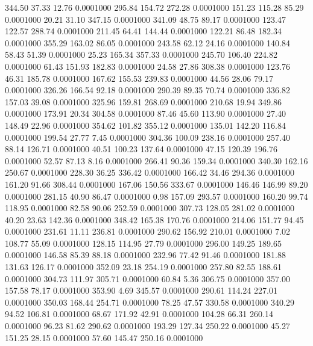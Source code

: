  344.50   37.33   12.76   0.0001000
 295.84  154.72  272.28   0.0001000
 151.23  115.28   85.29   0.0001000
  20.21   31.10  347.15   0.0001000
 341.09   48.75   89.17   0.0001000
 123.47  122.57  288.74   0.0001000
 211.45   64.41  144.44   0.0001000
 122.21   86.48  182.34   0.0001000
 355.29  163.02   86.05   0.0001000
 243.58   62.12   24.16   0.0001000
 140.84   58.43   51.39   0.0001000
  25.23  165.34  357.33   0.0001000
 245.70  106.40  224.82   0.0001000
  61.43  151.93  182.83   0.0001000
  24.58   27.86  308.38   0.0001000
 123.76   46.31  185.78   0.0001000
 167.62  155.53  239.83   0.0001000
  44.56   28.06   79.17   0.0001000
 326.26  166.54   92.18   0.0001000
 290.39   89.35   70.74   0.0001000
 336.82  157.03   39.08   0.0001000
 325.96  159.81  268.69   0.0001000
 210.68   19.94  349.86   0.0001000
 173.91   20.34  304.58   0.0001000
  87.46   45.60  113.90   0.0001000
  27.40  148.49   22.96   0.0001000
 354.62  101.82  355.12   0.0001000
 135.01  142.20  116.84   0.0001000
 199.54   27.77    7.45   0.0001000
 304.36  100.09  238.16   0.0001000
 257.40   88.14  126.71   0.0001000
  40.51  100.23  137.64   0.0001000
  47.15  120.39  196.76   0.0001000
  52.57   87.13    8.16   0.0001000
 266.41   90.36  159.34   0.0001000
 340.30  162.16  250.67   0.0001000
 228.30   36.25  336.42   0.0001000
 166.42   34.46  294.36   0.0001000
 161.20   91.66  308.44   0.0001000
 167.06  150.56  333.67   0.0001000
 146.46  146.99   89.20   0.0001000
 281.15   40.90   86.47   0.0001000
   0.98  157.09  293.57   0.0001000
 160.20   99.74  118.95   0.0001000
  82.58   90.06  252.59   0.0001000
 307.73  128.05  281.02   0.0001000
  40.20   23.63  142.36   0.0001000
 348.42  165.38  170.76   0.0001000
 214.06  151.77   94.45   0.0001000
 231.61   11.11  236.81   0.0001000
 290.62  156.92  210.01   0.0001000
   7.02  108.77   55.09   0.0001000
 128.15  114.95   27.79   0.0001000
 296.00  149.25  189.65   0.0001000
 146.58   85.39   88.18   0.0001000
 232.96   77.42   91.46   0.0001000
 181.88  131.63  126.17   0.0001000
 352.09   23.18  254.19   0.0001000
 257.80   82.55  188.61   0.0001000
 304.73  111.97  305.71   0.0001000
  60.84    5.36  306.75   0.0001000
 357.00  157.58   78.17   0.0001000
 353.90    4.69  345.57   0.0001000
 290.61  114.24  227.01   0.0001000
 350.03  168.44  254.71   0.0001000
  78.25   47.57  330.58   0.0001000
 340.29   94.52  106.81   0.0001000
  68.67  171.92   42.91   0.0001000
 104.28   66.31  260.14   0.0001000
  96.23   81.62  290.62   0.0001000
 193.29  127.34  250.22   0.0001000
  45.27  151.25   28.15   0.0001000
  57.60  145.47  250.16   0.0001000

